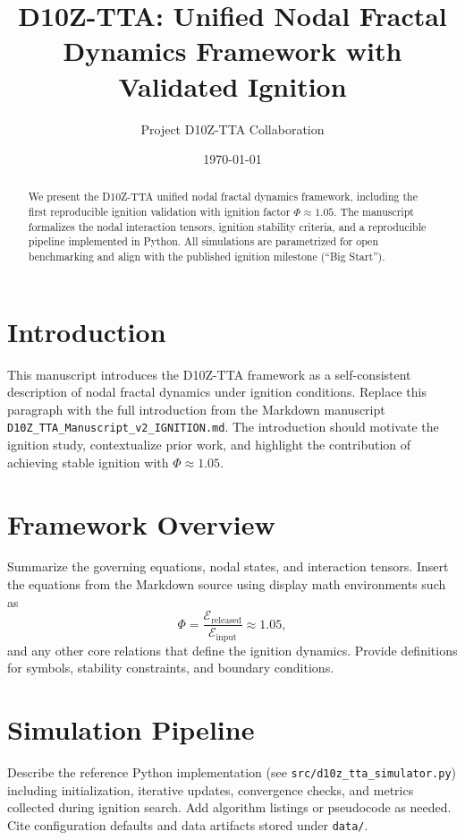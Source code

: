 \documentclass[11pt]{article}
\title{D10Z-TTA: Unified Nodal Fractal Dynamics Framework with Validated Ignition}
\author{Project D10Z-TTA Collaboration}
\date{\today}
\begin{document}
\maketitle

\begin{abstract}
We present the D10Z-TTA unified nodal fractal dynamics framework, including the first reproducible ignition validation with ignition factor \(\Phi \approx 1.05\). The manuscript formalizes the nodal interaction tensors, ignition stability criteria, and a reproducible pipeline implemented in Python. All simulations are parametrized for open benchmarking and align with the published ignition milestone (``Big Start'').
\end{abstract}

\tableofcontents

\section{Introduction}
This manuscript introduces the D10Z-TTA framework as a self-consistent description of nodal fractal dynamics under ignition conditions. Replace this paragraph with the full introduction from the Markdown manuscript \texttt{D10Z\_TTA\_Manuscript\_v2\_IGNITION.md}. The introduction should motivate the ignition study, contextualize prior work, and highlight the contribution of achieving stable ignition with \(\Phi \approx 1.05\).

\section{Framework Overview}
Summarize the governing equations, nodal states, and interaction tensors. Insert the equations from the Markdown source using display math environments such as
$$
\Phi = \frac{\mathcal{E}_{\text{released}}}{\mathcal{E}_{\text{input}}} \approx 1.05,
$$
and any other core relations that define the ignition dynamics. Provide definitions for symbols, stability constraints, and boundary conditions.

\section{Simulation Pipeline}
Describe the reference Python implementation (see \texttt{src/d10z\_tta\_simulator.py}) including initialization, iterative updates, convergence checks, and metrics collected during ignition search. Add algorithm listings or pseudocode as needed. Cite configuration defaults and data artifacts stored under \texttt{data/}.
\end{document}
